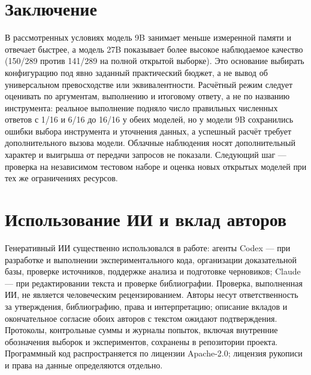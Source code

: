 \documentclass[14pt,a4paper]{extarticle}
\begin{document}
\section*{Заключение}
В рассмотренных условиях модель 9B занимает меньше измеренной памяти и отвечает быстрее, а модель 27B показывает более высокое наблюдаемое качество (150/289 против 141/289 на полной открытой выборке). Это основание выбирать конфигурацию под явно заданный практический бюджет, а не вывод об универсальном превосходстве или эквивалентности. Расчётный режим следует оценивать по аргументам, выполнению и итоговому ответу, а не по названию инструмента: реальное выполнение подняло число правильных численных ответов с 1/16 и 6/16 до 16/16 у обеих моделей, но у модели 9B сохранились ошибки выбора инструмента и уточнения данных, а успешный расчёт требует дополнительного вызова модели. Облачные наблюдения носят дополнительный характер и выигрыша от передачи запросов не показали. Следующий шаг — проверка на независимом тестовом наборе и оценка новых открытых моделей при тех же ограничениях ресурсов.

\section*{Использование ИИ и вклад авторов}
Генеративный ИИ существенно использовался в работе: агенты Codex — при разработке и выполнении экспериментального кода, организации доказательной базы, проверке источников, поддержке анализа и подготовке черновиков; Claude — при редактировании текста и проверке библиографии. Проверка, выполненная ИИ, не является человеческим рецензированием. Авторы несут ответственность за утверждения, библиографию, права и интерпретацию; описание вкладов и окончательное согласие обоих авторов с текстом ожидают подтверждения. Протоколы, контрольные суммы и журналы попыток, включая внутренние обозначения выборок и экспериментов, сохранены в репозитории проекта. Программный код распространяется по лицензии Apache-2.0; лицензия рукописи и права на данные определяются отдельно.
\end{document}
